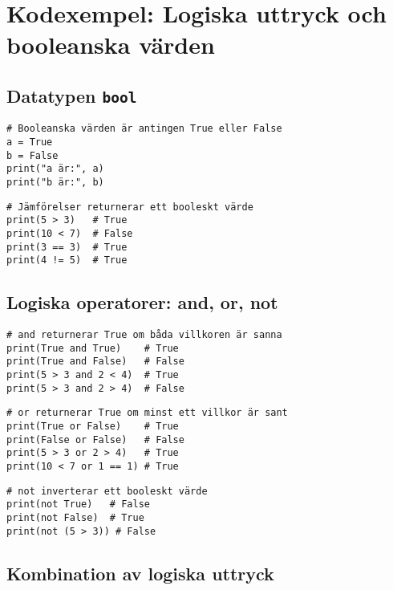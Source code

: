\section{Kodexempel: Logiska uttryck och booleanska värden}
\label{examples:boolean}
\subsection*{Datatypen \texttt{bool}}

\begin{lstlisting}[title=Exempel 1: Sanna och falska värden]
# Booleanska värden är antingen True eller False
a = True
b = False
print("a är:", a)
print("b är:", b)
\end{lstlisting}

\begin{lstlisting}[title=Exempel 2: Booleanska värden från jämförelser]
# Jämförelser returnerar ett booleskt värde
print(5 > 3)   # True
print(10 < 7)  # False
print(3 == 3)  # True
print(4 != 5)  # True
\end{lstlisting}

\subsection*{Logiska operatorer: and, or, not}

\begin{lstlisting}[title=Exempel 3: Använda \texttt{and}]
# and returnerar True om båda villkoren är sanna
print(True and True)    # True
print(True and False)   # False
print(5 > 3 and 2 < 4)  # True
print(5 > 3 and 2 > 4)  # False
\end{lstlisting}

\begin{lstlisting}[title=Exempel 4: Använda \texttt{or}]
# or returnerar True om minst ett villkor är sant
print(True or False)    # True
print(False or False)   # False
print(5 > 3 or 2 > 4)   # True
print(10 < 7 or 1 == 1) # True
\end{lstlisting}

\begin{lstlisting}[title=Exempel 5: Använda \texttt{not}]
# not inverterar ett booleskt värde
print(not True)   # False
print(not False)  # True
print(not (5 > 3)) # False
\end{lstlisting}

\subsection*{Kombination av logiska uttryck}

